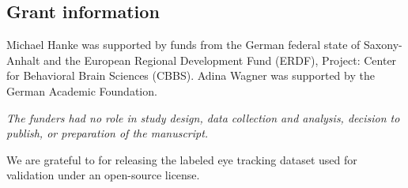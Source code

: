 \subsection*{Grant information}
Michael Hanke was supported by funds from the German federal state of
Saxony-Anhalt and the European Regional Development Fund (ERDF), 
Project: Center for Behavioral Brain Sciences (CBBS).
Adina Wagner was supported by the German Academic Foundation.

\textit{The funders had no role in study design, data collection and analysis,
decision to publish, or preparation of the manuscript.}

\begin{acknowledgements}
We are grateful to \cite{Andersson2017} for releasing the labeled
eye tracking dataset used for validation under an open-source license.
\end{acknowledgements}






